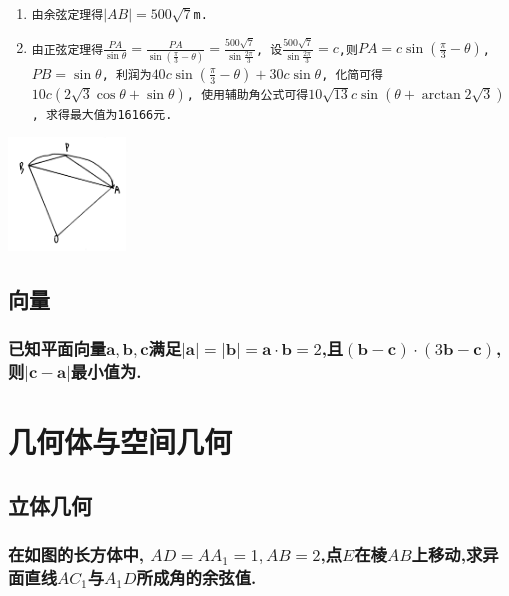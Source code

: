 \documentclass[oneside]{book}
\newcommand{\1}{\underline{\makebox[1cm]{}}}
\newcommand{\2}{\underline{\makebox[2cm]{}}}
\newcommand{\3}{\underline{\makebox[3cm]{}}}
\newcommand{\4}{\underline{\makebox[4cm]{}}}
\newcommand{\blkx}{\vspace*{4\baselineskip} }
\newcommand{\blkc}{\vspace*{6\baselineskip} }
\newcommand{\lge}{\large \texttt}
\newcommand{\vtr}{\mathbf}
\newlength{\la}
\begin{document}
        \begin{minipage}[b]{0.65\linewidth}
            \hfill
            \begin{enumerate}[(1)]
                \item \lge{由余弦定理得$|AB| = 500\sqrt{7}$m.}
                \item \lge{由正弦定理得$\frac{PA}{\sin\theta} = \frac{PA}{\sin(\frac{\pi}{3}-\theta)} = \frac{500\sqrt{7}}{\sin\frac{2\pi}{3}}$, 设$\frac{500\sqrt{7}}{\sin\frac{2\pi}{3}} = c$,则$PA = c \sin(\frac{\pi}{3}-\theta)$, $PB = \sin\theta$, 利润为$40c\sin(\frac{\pi}{3}-\theta) + 30c\sin\theta$, 化简可得$10c(2\sqrt{3}\cos\theta + \sin\theta)$, 使用辅助角公式可得$10\sqrt{13}c\sin(\theta + \arctan 2\sqrt{3})$, 求得最大值为16166元.}
            \end{enumerate}
            \end{minipage}
            \hfill
            \begin{minipage}[b]{0.25\linewidth}
            \includegraphics[height=85pt]{1.png}
        \end{minipage}

    \chapter{向量}
        \section{已知平面向量$\mathbf{a},\mathbf{b},\mathbf{c}$满足$|\vtr{a}|=|\vtr{b}|=\vtr{a}\cdot \vtr{b}=2$,且$(\vtr{b}-\vtr{c})\cdot(3\vtr{b}-\vtr{c})$,则$|\vtr{c}-\vtr{a}|$最小值为\3.}
        \blkc


\part{几何体与空间几何}

    \chapter{立体几何}
        \section{在如图的长方体中, $AD=AA_1=1, AB=2$,点$E$在棱$AB$上移动,求异面直线$AC_1$与$A_1D$所成角的余弦值.} 
        \blkx
\end{document}
